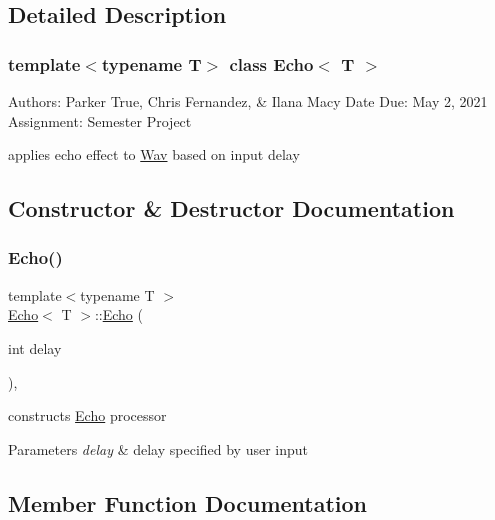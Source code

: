 \subsection{Detailed Description}
\subsubsection*{template$<$typename T$>$\newline
class Echo$<$ T $>$}

Authors\+: Parker True, Chris Fernandez, \& Ilana Macy Date Due\+: May 2, 2021 Assignment\+: Semester Project

applies echo effect to \hyperlink{classWav}{Wav} based on input delay 

\subsection{Constructor \& Destructor Documentation}
\mbox{\label{classEcho_af348cd7f23248e72046c5d006d3adca7}} 
\subsubsection{\texorpdfstring{Echo()}{Echo()}}
{\footnotesize\ttfamily template$<$typename T $>$ \\
\hyperlink{classEcho}{Echo}$<$ T $>$\+::\hyperlink{classEcho}{Echo} (\begin{DoxyParamCaption}\item[{int}]{delay }\end{DoxyParamCaption})\hspace{0.3cm}{\ttfamily [inline]}, {\ttfamily [explicit]}}

constructs \hyperlink{classEcho}{Echo} processor 
\begin{DoxyParams}{Parameters}
{\em delay} & delay specified by user input \\
\hline
\end{DoxyParams}


\subsection{Member Function Documentation}
\mbox{\label{classEcho_af5ea3baaa51600cf111f21f931895b46}} 
